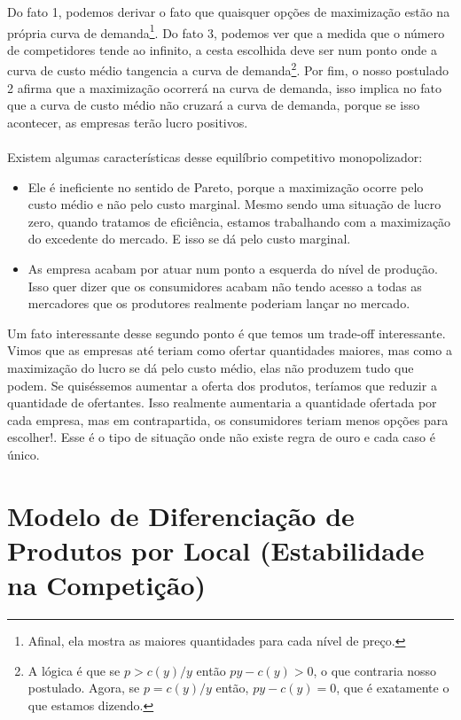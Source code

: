 \documentclass[a4paper,11pt,oneside]{book}
\theoremstyle{definition}
\theoremstyle{break}
\begin{document}
Do fato 1, podemos derivar o fato que quaisquer opções de maximização estão na própria curva de demanda\footnote{Afinal, ela mostra as maiores quantidades para cada nível de preço.}. Do fato 3, podemos ver que a medida que o número de competidores tende ao infinito, a cesta escolhida deve ser num ponto onde a curva de custo médio tangencia a curva de demanda\footnote{A lógica é que se $p > c(y)/y$ então $py - c(y) > 0$, o que contraria nosso postulado. Agora, se $p = c(y)/y$ então, $py - c(y) = 0$, que é exatamente o que estamos dizendo.}. Por fim, o nosso postulado 2 afirma que a maximização ocorrerá na curva de demanda, isso implica no fato que a curva de custo médio não cruzará a curva de demanda, porque se isso acontecer, as empresas terão lucro positivos.
\\
\\
Existem algumas características desse equilíbrio competitivo monopolizador:
\begin{itemize}
\item Ele é ineficiente no sentido de Pareto, porque a maximização ocorre pelo custo médio e não pelo custo marginal. Mesmo sendo uma situação de lucro zero, quando tratamos de eficiência, estamos trabalhando com a maximização do excedente do mercado. E isso se dá pelo custo marginal.
\item As empresa acabam por atuar num ponto a esquerda do nível de produção. Isso quer dizer que os consumidores acabam não tendo acesso a todas as mercadores que os produtores realmente poderiam lançar no mercado.
\end{itemize}

Um fato interessante desse segundo ponto é que temos um trade-off interessante. Vimos que as empresas até teriam como ofertar quantidades maiores, mas como a maximização do lucro se dá pelo custo médio, elas não produzem tudo que podem. Se quiséssemos aumentar a oferta dos produtos, teríamos que reduzir a quantidade de ofertantes. Isso realmente aumentaria a quantidade ofertada por cada empresa, mas em contrapartida, os consumidores teriam menos opções para escolher!. Esse é o tipo de situação onde não existe regra de ouro e cada caso é único.

\section{Modelo de Diferenciação de Produtos por Local (Estabilidade na Competição)}
\end{document}

